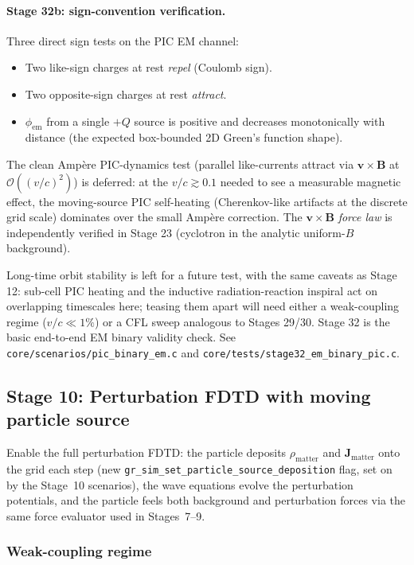 \documentclass[11pt,a4paper]{article}
\newcommand{\vv}[1]{\mathbf{#1}}
\newcommand{\order}[1]{\mathcal{O}(#1)}
\begin{document}
\paragraph{Stage 32b: sign-convention verification.}  Three direct
sign tests on the PIC EM channel:
\begin{itemize}
  \item Two like-sign charges at rest \emph{repel} (Coulomb sign).
  \item Two opposite-sign charges at rest \emph{attract}.
  \item $\phi_{\mathrm{em}}$ from a single $+Q$ source is positive and
        decreases monotonically with distance (the expected
        box-bounded 2D Green's function shape).
\end{itemize}
The clean Amp\`ere PIC-dynamics test (parallel like-currents attract
via $\vv{v}\times\vv{B}$ at $\order{(v/c)^2}$) is deferred: at the
$v/c \gtrsim 0.1$ needed to see a measurable magnetic effect, the
moving-source PIC self-heating (Cherenkov-like artifacts at the
discrete grid scale) dominates over the small Amp\`ere correction.
The $\vv{v}\times\vv{B}$ \emph{force law} is independently verified
in Stage 23 (cyclotron in the analytic uniform-$B$ background).

Long-time orbit stability is left for a future test, with the same
caveats as Stage 12: sub-cell PIC heating and the inductive
radiation-reaction inspiral act on overlapping timescales here; teasing
them apart will need either a weak-coupling regime ($v/c \ll 1\%$) or
a CFL sweep analogous to Stages 29/30.  Stage 32 is the basic
end-to-end EM binary validity check.  See
\texttt{core/scenarios/pic\_binary\_em.c} and
\texttt{core/tests/stage32\_em\_binary\_pic.c}.

\subsection{Stage 10: Perturbation FDTD with moving particle source}
\label{sec:stage_perturb_fdtd}

Enable the full perturbation FDTD: the particle deposits $\rho_{\mathrm{matter}}$ and $\vv{J}_{\mathrm{matter}}$ onto the grid each step (new \texttt{gr\_sim\_set\_particle\_source\_deposition} flag, set on by the Stage~10 scenarios), the wave equations evolve the perturbation potentials, and the particle feels both background and perturbation forces via the same force evaluator used in Stages~7--9.

\subsubsection*{Weak-coupling regime}
\end{document}
